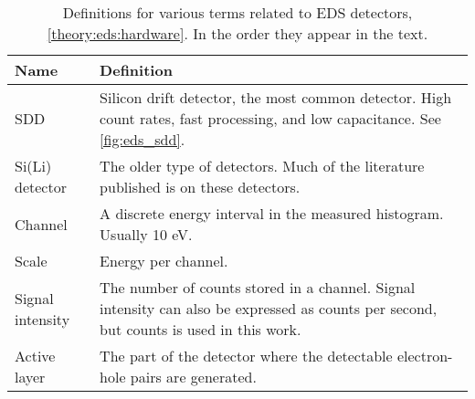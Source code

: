 \begin{table}[pht]
    \begin{center}
        \caption{
            Definitions for various terms related to EDS detectors, \cref{theory:eds:hardware}. 
            In the order they appear in the text.
            }
        \renewcommand*{\arraystretch}{1.4}
        \label{tab:eds:hardware}
        \begin{tabular}{p{2.6cm}p{12cm}}
            \hline
            \textbf{Name}                   & \textbf{Definition}                                                                                                                                                                                                                                 \\
            \hline
            SDD                             & Silicon drift detector, the most common detector.  High count rates, fast processing, and low capacitance.  See \cref{fig:eds_sdd}.                                                                                                                 \\
            Si(Li) detector                 & The older type of detectors. Much of the literature published is on these detectors.                                                                                                                                                                \\
            Channel                         & A discrete energy interval in the measured histogram. Usually 10 eV.                                                                                                                                                                                \\
            Scale                           & Energy per channel.                                                                                                                                                                                                                                 \\
            Signal intensity                & The number of counts stored in a channel. Signal intensity can also be expressed as counts per second, but counts is used in this work.                                                                                                             \\
            Active layer                    & The part of the detector where the detectable electron-hole pairs are generated.                                                                                                                                                                    \\

\end{tabular}
\end{center}
\end{table}
